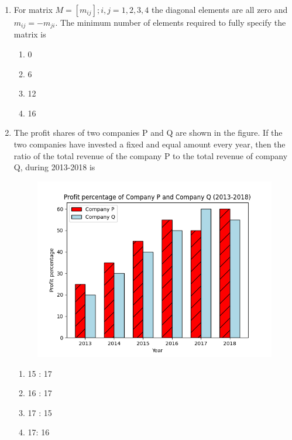 \documentclass[journal,12pt,onecolumn]{IEEEtran}
\theoremstyle{remark}
\begin{document}
\begin{enumerate}
\item For matrix $M = [m_{ij}]; i,j = 1,2,3,4$ the diagonal elements are all zero and $m_{ij} = -m_{ji}$. The minimum number of elements required to fully specify the matrix is \underline{\hspace{2cm}}
\begin{enumerate}
    \item 0
    \item 6
    \item 12
    \item 16
\end{enumerate}

\item \label{q10} The profit shares of two companies P and Q are shown in the figure. If the two companies have invested a fixed and equal amount every year, then the ratio of the total revenue of the company P to the total revenue of company Q, during 2013-2018 is \underline{\hspace{2cm}}
\begin{figure}[h!]
    \centering
    \includegraphics[width=0.5\linewidth]{plots/Figure_1.png} 
\end{figure}
\begin{enumerate}
    \item 15 : 17
    \item 16 : 17
    \item 17 : 15
    \item 17: 16
\end{enumerate}

\end{enumerate}
\end{document}
